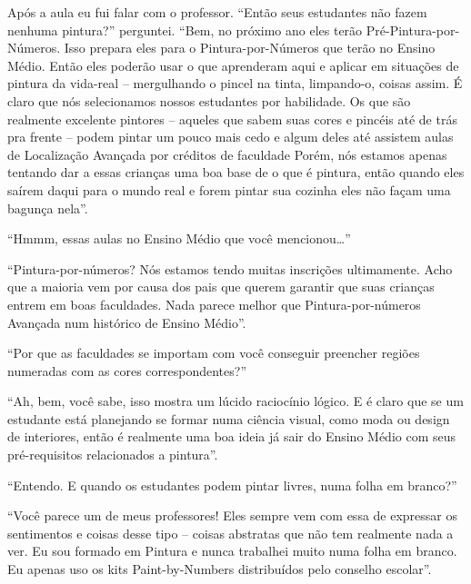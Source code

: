 \documentclass[a4paper,oneside,12pt,notitlepage]{article}
\begin{document}
Após a aula eu fui falar com o professor.
``Então seus estudantes não fazem nenhuma pintura?''
perguntei.
``Bem, no próximo ano eles terão Pré-Pintura-por-Números.
Isso prepara eles para o Pintura-por-Números que terão no Ensino Médio.
Então eles poderão usar o que aprenderam aqui e aplicar em situações de pintura da vida-real -- mergulhando o pincel na tinta, limpando-o, coisas assim.
É claro que nós selecionamos nossos estudantes por habilidade.
Os que são realmente excelente pintores -- aqueles que sabem suas cores e pincéis até de trás pra frente -- podem pintar um pouco mais cedo e algum deles até assistem aulas de Localização Avançada por créditos de faculdade
Porém, nós estamos apenas tentando dar a essas crianças uma boa base de o que é pintura, então quando eles saírem daqui para o mundo real e forem pintar sua cozinha eles não façam uma bagunça nela''.

``Hmmm, essas aulas no Ensino Médio que você mencionou\ldots{}''

``Pintura-por-números?
Nós estamos tendo muitas inscrições ultimamente.
Acho que a maioria vem por causa dos pais que querem garantir que suas crianças entrem em boas faculdades.
Nada parece melhor que Pintura-por-números Avançada num histórico de Ensino Médio''.

``Por que as faculdades se importam com você conseguir preencher regiões numeradas com as cores correspondentes?''

``Ah, bem, você sabe, isso mostra um lúcido raciocínio lógico.
E é claro que se um estudante está planejando se formar numa ciência visual, como moda ou design de interiores, então é realmente uma boa ideia já sair do Ensino Médio com seus pré-requisitos relacionados a pintura''.

``Entendo.
E quando os estudantes podem pintar livres, numa folha em branco?''

``Você parece um de meus professores!
Eles sempre vem com essa de expressar os sentimentos e coisas desse tipo -- coisas abstratas que não tem realmente nada a ver.
Eu sou formado em Pintura e nunca trabalhei muito numa folha em branco.
Eu apenas uso os kits Paint-by-Numbers distribuídos pelo conselho escolar''.

\vspace{1em}
\end{document}
